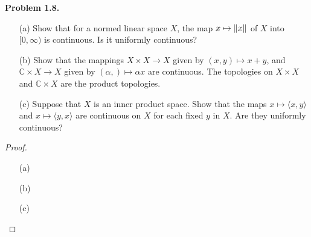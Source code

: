 \documentclass[12pt]{article}
\theoremstyle{definition}
\begin{document}
\noindent \textbf{Problem 1.8.} ~
	\begin{itemize}
		\item[(a)] Show that for a normed linear space $X$, the map $x \mapsto \norm{x}$ of $X$ into $[0, \infty)$ is continuous. Is it uniformly continuous?
		
		\item[(b)] Show that the mappings $X \times X \to X$ given by $(x, y) \mapsto x + y$, and $\mathbb{C} \times X \to X$ given by $(\alpha, ) \mapsto \alpha x$ are continuous. The topologies on $X \times X$ and $\mathbb{C} \times X$ are the product topologies.  
		
		\item[(c)] Suppose that $X$ is an inner product space. Show that the maps $x \mapsto \langle x, y\rangle$ and $x \mapsto \langle y, x\rangle$ are continuous on $X$ for each fixed $y$ in $X$. Are they uniformly continuous? 
	\end{itemize}
	\begin{proof} ~
		\begin{itemize}
			\item[(a)]
			
			\item[(b)]
			
			\item[(c)] 
		\end{itemize}
	\end{proof}
\end{document}
